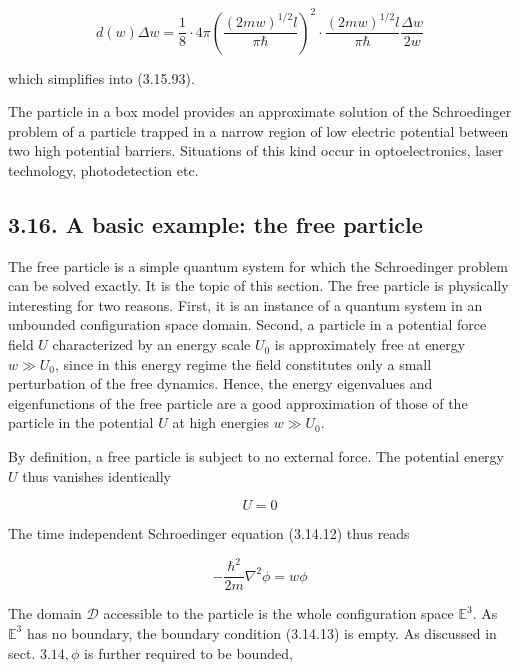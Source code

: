 \documentclass{article}
\begin{document}
\begin{equation*}
d(w) \Delta w=\frac{1}{8} \cdot 4 \pi\left(\frac{(2 m w)^{1 / 2} l}{\pi \hbar}\right)^{2} \cdot \frac{(2 m w)^{1 / 2} l}{\pi \hbar} \frac{\Delta w}{2 w} \tag{3.15.95}
\end{equation*}
 
which simplifies into (3.15.93).

The particle in a box model provides an approximate solution of the Schroedinger problem of a particle trapped in a narrow region of low electric potential between two high potential barriers. Situations of this kind occur in optoelectronics, laser technology, photodetection etc.

\subsection*{3.16. A basic example: the free particle}

The free particle is a simple quantum system for which the Schroedinger problem can be solved exactly. It is the topic of this section. The free particle is physically interesting for two reasons. First, it is an instance of a quantum system in an unbounded configuration space domain. Second, a particle in a potential force field $U$ characterized by an energy scale $U_{0}$ is approximately free at energy $w \gg U_{0}$, since in this energy regime the field constitutes only a small perturbation of the free dynamics. Hence, the energy eigenvalues and eigenfunctions of the free particle are a good approximation of those of the particle in the potential $U$ at high energies $w \gg U_{0}$.

By definition, a free particle is subject to no external force. The potential energy $U$ thus vanishes identically
 
\begin{equation*}
U=0 \tag{3.16.1}
\end{equation*}
 

The time independent Schroedinger equation (3.14.12) thus reads
 
\begin{equation*}
-\frac{\hbar^{2}}{2 m} \nabla^{2} \phi=w \phi \tag{3.16.2}
\end{equation*}
 

The domain $\mathcal{D}$ accessible to the particle is the whole configuration space $\mathbb{E}^{3}$. As $\mathbb{E}^{3}$ has no boundary, the boundary condition (3.14.13) is empty. As discussed in sect. $3.14, \phi$ is further required to be bounded,
 
\end{document}
